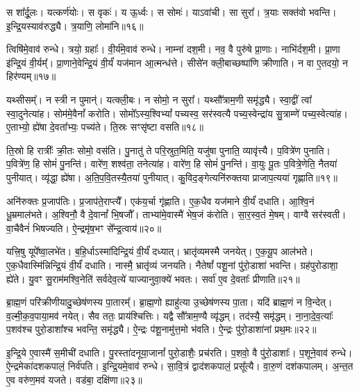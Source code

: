 स शा᳚र्दू॒लः।
यत्कर्ण॑योः।
स वृकः॑।
य ऊ॒र्ध्वः।
स सोमः॑।
याऽवा॑ची।
सा सुरा᳚।
त्र॒याः सक्त॑वो भवन्ति।
इ॒न्द्रि॒यस्याव॑रुद्ध्यै।
त्र॒याणि॒ लोमा॑नि॥१६॥

त्विषि॑मे॒वाव॑ रुन्धे।
त्रयो॒ ग्रहाः᳚।
वी॒र्य॑मे॒वाव॑ रुन्धे।
नाम्ना॑ दश॒मी।
नव॒ वै पुरु॑षे प्रा॒णाः।
नाभि॑र्दश॒मी।
प्रा॒णा इ॑न्द्रि॒यं वी॒र्यम्᳚।
प्रा॒णाने॒वेन्द्रि॒यं वी॒र्यं॑ यज॑मान आ॒त्मन्ध॑त्ते।
सीसे॑न क्ली॒बाच्छष्पा॑णि क्रीणाति।
न वा ए॒तदयो॒ न हिर॑ण्यम्॥१७॥

यथ्सीसम्᳚।
न स्त्री न पुमान्॑।
यत्क्ली॒बः।
न सोमो॒ न सुरा᳚।
यथ्सौ᳚त्राम॒णी समृ॑द्ध्यै।
स्वा॒द्वीं त्वा᳚ स्वा॒दुनेत्या॑ह।
सोम॑मे॒वैनां᳚ करोति।
सोमो᳚\-ऽस्य॒श्विभ्यां᳚ पच्यस्व॒ सर॑स्वत्यै पच्य॒स्वेन्द्रा॑य सु॒त्राम्णे॑ पच्य॒स्वेत्या॑ह।
ए॒ताभ्यो॒ ह्ये॑षा दे॒वता᳚भ्यः॒ पच्य॑ते।
ति॒स्रः सꣳसृ॑ष्टा वसति॥१८॥

ति॒स्रो हि रात्रीः᳚ क्री॒तः सोमो॒ वस॑ति।
पु॒नातु॑ ते परि॒स्रुत॒मिति॒ यजु॑षा पुनाति॒ व्यावृ॑त्त्यै।
प॒वित्रे॑ण पुनाति।
प॒वित्रे॑ण॒ हि सोमं॑ पु॒नन्ति॑।
वारे॑ण॒ शश्व॑ता॒ तनेत्या॑ह।
वारे॑ण॒ हि सोमं॑ पु॒नन्ति॑।
वा॒युः पू॒तः प॒वित्रे॒णेति॒ नैतया॑ पुनीयात्।
व्यृ॑द्धा॒ ह्ये॑षा।
अ॒ति॒प॒वि॒तस्यै॒तया॑ पुनीयात्।
कु॒विद॒ङ्गेत्यनि॑रुक्तया प्राजाप॒त्यया॑ गृह्णाति॥१९॥

अनि॑रुक्तः प्र॒जा\-प॑तिः।
प्र॒जा\-प॑ते॒राप्त्यै᳚।
एक॑य॒र्चा गृ॑ह्णाति।
ए॒क॒धैव यज॑माने वी॒र्यं॑ दधाति।
आ॒श्वि॒नं धू॒म्रमाल॑भते।
अ॒श्विनौ॒ वै दे॒वानां᳚ भि॒षजौ᳚।
ताभ्या॑मे॒वास्मै॑ भेष॒जं क॑रोति।
सा॒र॒स्व॒तं मे॒षम्।
वाग्वै सर॑स्वती।
वा॒चैवैनं॑ भिषज्यति।
ऐ॒न्द्रमृ॑ष॒भꣳ से᳚न्द्र॒त्वाय॑॥२०॥\anuvakamend[अक्ष्यो॒र्लोमा॑नि॒ हिर॑ण्यं वसति गृह्णाति भिषज्य॒त्येकं॑ च]

यत्त्रि॒षु यूपे᳚ष्वा॒लभे॑त।
ब॒हि॒र्धा\-ऽस्मा॑दिन्द्रि॒यं वी॒र्यं॑ दध्यात्।
भ्रातृ॑व्यमस्मै जनयेत्।
ए॒क॒यू॒प आल॑भते।
ए॒क॒धैवास्मि॑न्निन्द्रि॒यं वी॒र्यं॑ दधाति।
नास्मै॒ भ्रातृ॑व्यं जनयति।
नैतेषां᳚ पशू॒नां पु॑रो॒डाशा॑ भवन्ति।
ग्रह॑पुरोडाशा॒ ह्ये॑ते।
यु॒वꣳ सु॒राम॑मश्वि॒नेति॑ सर्वदेव॒त्ये॑ याज्यानुवा॒क्ये॑ भवतः।
सर्वा॑ ए॒व दे॒वताः᳚ प्रीणाति॥२१॥

ब्रा॒ह्म॒णं परि॑क्रीणीयादु॒च्छेष॑णस्य पा॒तारम्᳚।
ब्रा॒ह्म॒णो ह्याहु॑त्या उ॒च्छेष॑णस्य पा॒ता।
यदि॑ ब्राह्म॒णं न वि॒न्देत्।
व॒ल्मी॒क॒व॒पाया॒मव॑ नयेत्।
सैव ततः॒ प्राय॑श्चित्तिः।
यद्वै सौ᳚त्राम॒ण्यै व्यृ॑द्धम्।
तद॑स्यै॒ समृ॑द्धम्।
ना॒ना॒दे॒व॒त्याः᳚ प॒शव॑श्च पुरो॒डाशा᳚श्च भवन्ति॒ समृ॑द्ध्यै।
ऐ॒न्द्रः प॑शू॒नामु॑त्त॒मो भ॑वति।
ऐ॒न्द्रः पु॑रो॒डाशा॑नां प्रथ॒मः॥२२॥

इ॒न्द्रि॒ये ए॒वास्मै॑ स॒मीची॑ दधाति।
पु॒रस्ता॑दनूया॒जानां᳚ पुरो॒डाशैः॒ प्रच॑रति।
प॒शवो॒ वै पु॑रो॒डाशाः᳚।
प॒शूने॒वाव॑ रुन्धे।
ऐ॒न्द्रमेका॑\-दश\-कपालं॒ निर्व॑पति।
इ॒न्द्रि॒यमे॒वाव॑ रुन्धे।
सा॒वि॒त्रं द्वाद॑शकपालं॒ प्रसू᳚त्यै।
वा॒रु॒णं दश॑कपालम्।
अ॒न्त॒त ए॒व वरु॑ण॒मव॑ यजते।
वड॑बा॒ दक्षि॑णा॥२३॥


